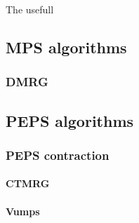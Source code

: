 
The usefull

\subsection{MPS algorithms}

\subsubsection{DMRG}

\subsection{PEPS algorithms}

\subsubsection{ PEPS contraction }

\paragraph{CTMRG}

\paragraph{Vumps}